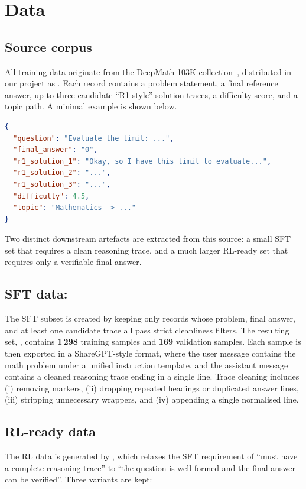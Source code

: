 \section{Data}
\label{sec:data}

\subsection{Source corpus}
All training data originate from the DeepMath-103K
collection~\cite{deepmath103k}, distributed in our project as
. Each record contains a problem
statement, a final reference answer, up to three candidate ``R1-style''
solution traces, a difficulty score, and a topic path. A minimal example is
shown below.

\begin{lstlisting}[language=json,caption={A raw record from
\code{deepmath\_103k\_raw.jsonl}.}]
{
  "question": "Evaluate the limit: ...",
  "final_answer": "0",
  "r1_solution_1": "Okay, so I have this limit to evaluate...",
  "r1_solution_2": "...",
  "r1_solution_3": "...",
  "difficulty": 4.5,
  "topic": "Mathematics -> ..."
}
\end{lstlisting}

Two distinct downstream artefacts are extracted from this source: a small
SFT set that requires a clean reasoning trace, and a much larger RL-ready
set that requires only a verifiable final answer.

\subsection{SFT data: }
The SFT subset is created by keeping only records whose problem,
final answer, and at least one candidate trace all pass strict cleanliness
filters. The resulting set, , contains \textbf{1\,298}
training samples and \textbf{169} validation samples. Each sample is then
exported in a ShareGPT-style  format, where the user message
contains the math problem under a unified instruction template, and the
assistant message contains a cleaned reasoning trace ending in a single
 line. Trace cleaning includes (i) removing
 markers, (ii) dropping repeated  headings
or duplicated answer lines, (iii) stripping unnecessary  wrappers, and (iv) appending a single normalised
 line.

\subsection{RL-ready data}
The RL data is generated by , which
relaxes the SFT requirement of ``must have a complete reasoning trace'' to
``the question is well-formed and the final answer can be verified''. Three
variants are kept:

